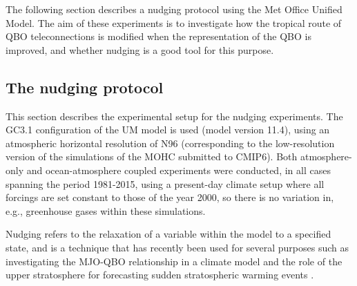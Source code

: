 The following section describes a nudging protocol using the Met Office Unified Model. The aim of these experiments is to investigate how the tropical route of QBO teleconnections is modified when the representation of the QBO is improved, and whether nudging is a good tool for this purpose.

\subsection{The nudging protocol}



This section describes the experimental setup for the nudging experiments. 
The GC3.1 configuration of the UM model is used (model version 11.4), using an atmospheric horizontal resolution of N96 (corresponding to the low-resolution version of the simulations of the MOHC submitted to CMIP6). 
Both atmosphere-only and ocean-atmosphere coupled experiments were conducted, in all cases spanning the period 1981-2015, using a present-day climate setup where all forcings are set constant to those of the year 2000, so there is no variation in, e.g., greenhouse gases within these simulations.

Nudging refers to the relaxation of a variable within the model to a specified state, and is a technique that has recently been used for several purposes such as investigating the MJO-QBO relationship in a climate model \citep{martin2021} and the role of the upper stratosphere for forecasting sudden stratospheric warming events \citep{gray2020}.

